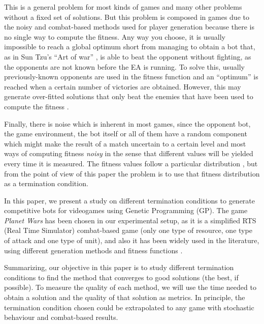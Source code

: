 \documentclass[runningheads,a4paper]{llncs}
\begin{document}
This is a general problem for most kinds of games and many other
problems without a fixed set of solutions. But this problem is
composed in games due to
the noisy and combat-based methods used for player generation because
there is no single way to compute the fitness. Any way you choose, it
is usually impossible to reach a global optimum short from managing to obtain a bot that, as
in Sun Tzu's ``Art of war'' \cite{tzu2013art}, is able to beat the opponent without
fighting, as the opponents are not known before the EA is running. To
solve this, usually previously-known opponents are used in the fitness
function and an ``optimum'' is reached when a certain number of
victories are obtained. %
However, this may generate over-fitted
solutions that only beat the  enemies that have been used to compute
the fitness \cite{DBLP:journals/jcst/MoraFGGF12}.

Finally, there is noise which is inherent in most games, since the
opponent bot, the game environment, the bot itself or all of them have
a random component which might make the result of a match uncertain to
a certain level and most ways of computing fitness {\em noisy} in the
sense that different values will be yielded every time it is
measured. The fitness values follow a particular distribution
\cite{merelo14:noisy}, but from the point of view of this paper the
problem is to use that fitness distribution as a termination
condition. 


In this paper, we present a study on different termination conditions to 
generate competitive bots for videogames using Genetic Programming (GP). The game \textit{Planet Wars} has been chosen in 
our experimental setup, as it is a simplified RTS (Real Time Simulator) combat-based
game (only one type of resource, one type of attack and one type
of unit), and also it has been widely used in the literature, using different generation methods and fitness functions 
\cite{DBLP:journals/jcst/MoraFGGF12,DBLP:conf/cec/Fernandez-AresMGGF11,DBLP:journals/nc/Lara-CabreraCL14,NogueiraCoevolutionary14}. 

Summarizing, our objective in this paper is to study different 
termination conditions to find the method that converges to good 
solutions (the best, if possible). %
To measure the quality of each 
method, we will %
use the time needed to obtain a solution and the
quality of that solution as metrics. In principle, the termination
condition chosen could be extrapolated to any game with
stochastic behaviour and combat-based results.
\end{document}
